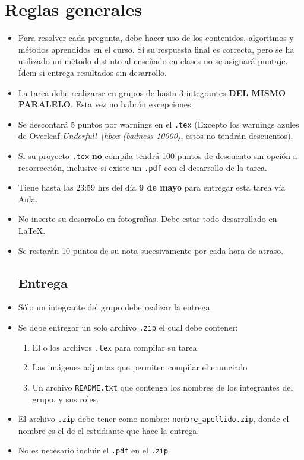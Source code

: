 \documentclass[letterpaper,10pt]{article}
\begin{document}
\section{Reglas generales}
\begin{itemize}
    
    \item Para resolver cada pregunta, debe hacer uso de los contenidos, algoritmos y métodos aprendidos en el curso. Si su respuesta final es correcta, pero se ha utilizado un método distinto al enseñado en clases no se asignará puntaje. Ídem si entrega resultados sin desarrollo.
    
    \item La tarea debe realizarse en grupos de hasta 3 integrantes \textbf{\large DEL MISMO PARALELO}. Esta vez no habrán excepciones.
    
    \item Se descontará 5 puntos por warnings en el \texttt{.tex} (Excepto los warnings azules de Overleaf \textit{Underfull \textbackslash hbox (badness 10000)}, estos no tendrán descuentos).
    
    \item Si su proyecto \texttt{.tex} \textbf{no} compila tendrá 100 puntos de descuento sin opción a recorrección, inclusive si existe un \texttt{.pdf} con el desarrollo de la tarea.
        
    \item Tiene hasta las 23:59 hrs del día \textbf{9 de mayo} para entregar esta tarea vía Aula.
    
    \item No inserte su desarrollo en fotografías. Debe estar todo desarrollado en \LaTeX.
    
    \item Se restarán 10 puntos de su nota sucesivamente por cada hora de atraso.
    
    \subsection{Entrega}
     \item Sólo un integrante del grupo debe realizar la entrega.
     
     \item Se debe entregar un solo archivo \texttt{.zip} el cual debe contener:
     \begin{enumerate}
         \item El o los archivos \texttt{.tex} para compilar su tarea.
         \item Las imágenes adjuntas que permiten compilar el enunciado
         \item Un archivo \texttt{README.txt} que contenga los nombres de los integrantes del grupo, y sus roles.
     \end{enumerate}
     \item El archivo \texttt{.zip} debe tener como nombre: \texttt{nombre\_apellido.zip}, donde el nombre es el de el estudiante que hace la entrega.
     \item No es necesario incluir el \texttt{.pdf} en el \texttt{.zip}
    

    
\end{itemize}
\newpage
\end{document}
